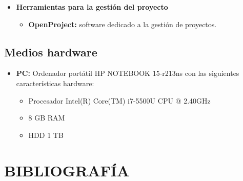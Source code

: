 \documentclass{pre-tfg}
\begin{document}
\begin{itemize}
\item \textbf{Herramientas para la gestión del proyecto}
\begin{itemize}
\item \textbf{OpenProject:} software dedicado a la gestión de proyectos.
\end{itemize}
\end{itemize}

\subsection{Medios hardware}

\begin{itemize}
\item \textbf{PC:} Ordenador portátil HP NOTEBOOK 15-r213ns con las siguientes características hardware:
\begin{itemize}
\item Procesador Intel(R) Core(TM) i7-5500U CPU @ 2.40GHz
\item 8 GB RAM
\item HDD 1 TB
\end{itemize}
\end{itemize}

\newpage

\section{BIBLIOGRAFÍA}

\singlespacing


\end{document}
